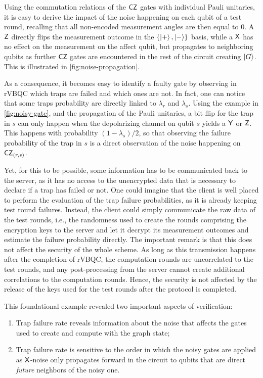 

Using the commutation relations of the \(\mathsf{CZ}\) gates with individual Pauli unitaries, it is easy to derive the impact of the noise happening on each qubit of a test round, recalling that all non-encoded measurement angles are then equal to 0. A \(\mathsf{Z}\) directly flips the measurement outcome in the \(\{\ket +, \ket - \}\) basis, while a \(\mathsf{X}\) has no effect on the measurement on the affect qubit, but propagates to neighboring qubits as further \(\mathsf{CZ}\) gates are encountered in the rest of the circuit creating \(\ket G\). This is illustrated in \cref{fig:noise-propagation}.



As a consequence, it becomes easy to identify a faulty gate by observing in rVBQC which traps are failed and which ones are not. In fact, one can notice that some traps probability are directly linked to \(\lambda_r\) and \(\lambda_s\). Using the example in \cref{fig:noisy-gate}, and the propagation of the Pauli unitaries, a bit flip for the trap in \(s\) can only happen when the depolarizing channel on qubit \(s\) yields a \(\mathsf{Y}\) or \(\mathsf{Z}\). This happens with probability \((1-\lambda_s)/2\), so that observing the failure probability of the trap in \(s\) is a direct observation of the noise happening on \(\mathsf{CZ}_{(r,s)}\).

Yet, for this to be possible, some information has to be communicated back to the server, as it has no access to the unencrypted data that is necessary to declare if a trap has failed or not. One could imagine that the client is well placed to perform the evaluation of the trap failure probabilities, as it is already keeping test round failures. Instead, the client could simply communicate the raw data of the test rounds, i.e., the randomness used to create the rounds comprising the encryption keys to the server and let it decrypt its measurement outcomes and estimate the failure probability directly. The important remark is that this does not affect the security of the whole scheme. As long as this transmission happens after the completion of rVBQC, the computation rounds are uncorrelated to the test rounds, and any post-processing from the server cannot create additional correlations to the computation rounds. Hence, the security is not affected by the release of the keys used for the test rounds after the protocol is completed.

This foundational example revealed two important aspects of verification:
\begin{enumerate}
\item Trap failure rate reveals information about the noise that affects the gates used to create and compute with the graph state;
\item Trap failure rate is sensitive to the order in which the noisy gates are applied as \(\mathsf{X}\)-noise only propagates forward in the circuit to qubits that are direct \emph{future} neighbors of the noisy one.
\end{enumerate}

